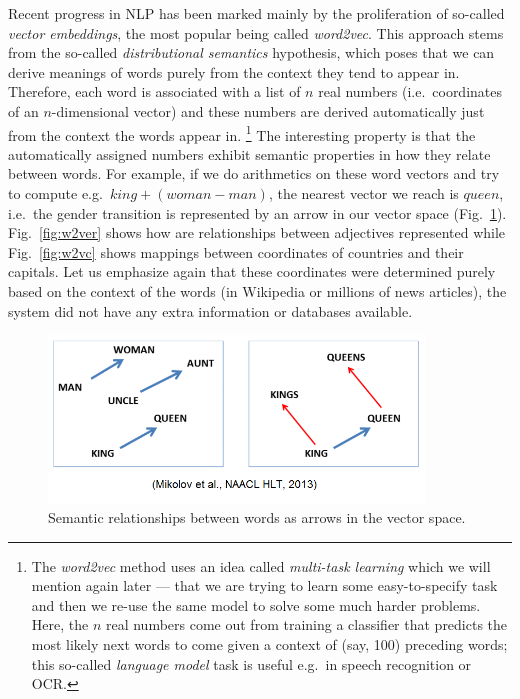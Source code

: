\documentclass[11pt,a4paper]{article}
\begin{document}
Recent progress in NLP has been marked mainly by the proliferation of
so-called \textit{vector embeddings}, the most popular being called
\textit{word2vec}.  This approach stems from the so-called \textit{distributional semantics}
hypothesis, which poses that we can derive meanings of words purely
from the context they tend to appear in.  Therefore, each word is
associated with a list of $n$ real numbers (i.e.\ coordinates of
an $n$-dimensional vector) and these numbers are derived automatically
just from the context the words appear in.%
\footnote{The \textit{word2vec} method uses an idea called \textit{multi-task learning}
	which we will mention again later --- that we are trying to learn
	some easy-to-specify task and then we re-use the same model to
	solve some much harder problems.  Here, the $n$ real numbers
	come out from training a classifier that predicts the most likely
	next words to come given a context of (say, 100) preceding words;
	this so-called \textit{language model} task is useful e.g.\ in
	speech recognition or OCR.}
The interesting property is that the automatically assigned numbers
exhibit semantic properties in how they relate between words.
For example, if we do arithmetics on these word vectors and try
to compute e.g.\ $king + (woman - man)$, the nearest vector we reach
is $queen$, i.e.\ the gender transition is represented by an arrow
in our vector space (Fig.~\ref{fig:w2vg}).
Fig.~\ref{fig:w2ver} shows how are relationships between adjectives represented
while Fig.~\ref{fig:w2vc} shows mappings between coordinates of countries
and their capitals.  Let us emphasize again that these coordinates were
determined purely based on the context of the words (in Wikipedia or
millions of news articles), the system did not have any extra information
or databases available.

\begin{figure}
	\centering
	\includegraphics[width=10cm]{kingqueen.png}
	\caption{Semantic relationships between words as arrows in the vector space.}
	\label{fig:w2vg}
\end{figure}
\end{document}
